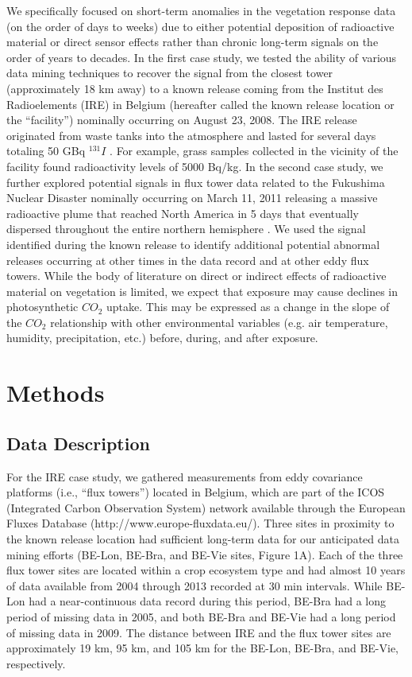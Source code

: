 \documentclass{article}
\begin{document}
We specifically focused on short-term anomalies in the vegetation response data (on the order of days to weeks) due to either potential deposition of radioactive material or direct sensor effects rather than chronic long-term signals on the order of years to decades. In the first case study, we tested the ability of various data mining techniques to recover the signal from the closest tower (approximately 18 km away) to a known release coming from the Institut des Radioelements (IRE) in Belgium (hereafter called the known release location or the “facility”) nominally occurring on August 23, 2008. The IRE release originated from waste tanks into the atmosphere and lasted for several days totaling 50 GBq $^{131}I$ \citep{carle2010individual}. For example, grass samples collected in the vicinity of the facility found radioactivity levels of 5000 Bq/kg. In the second case study, we further explored potential signals in flux tower data related to the Fukushima Nuclear Disaster nominally occurring on March 11, 2011 releasing a massive radioactive plume that reached North America in 5 days that eventually dispersed throughout the entire northern hemisphere \citep{meszarosPredictabilityDispersionFukushimaderived2016}. We used the signal identified during the known release to identify additional potential abnormal releases occurring at other times in the data record and at other eddy flux towers. While the body of literature on direct or indirect effects of radioactive material on vegetation is limited, we expect that exposure may cause declines in photosynthetic $CO_2$ uptake. This may be expressed as a change in the slope of the $CO_2$ relationship with other environmental variables (e.g. air temperature, humidity, precipitation, etc.) before, during, and after exposure.


\section{Methods}

\subsection{Data Description}

For the IRE case study, we gathered measurements from eddy covariance platforms (i.e., “flux towers”) located in Belgium, which are part of the ICOS (Integrated Carbon Observation System) network available through the European Fluxes Database (http://www.europe-fluxdata.eu/). Three sites in proximity to the known release location had sufficient long-term data for our anticipated data mining efforts (BE-Lon, BE-Bra, and BE-Vie sites, Figure 1A). Each of the three flux tower sites are located within a crop ecosystem type and had almost 10 years of data available from 2004 through 2013 recorded at 30 min intervals. While BE-Lon had a near-continuous data record during this period, BE-Bra had a long period of missing data in 2005, and both BE-Bra and BE-Vie had a long period of missing data in 2009. The distance between IRE and the flux tower sites are approximately 19 km, 95 km, and 105 km for the BE-Lon, BE-Bra, and BE-Vie, respectively.
\end{document}
